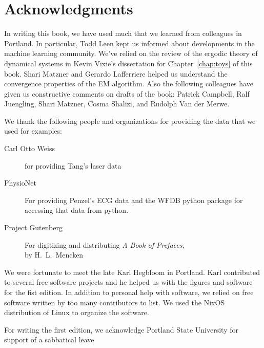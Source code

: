 \documentclass[ltxbook,showlabels, commentsvisible]{hmmdsbook}
\begin{document}
\section*{Acknowledgments}
%
\label{sec:ack}
\longpage%

In writing this book, we have used much that we learned from colleagues
in Portland.  In particular, Todd Leen kept us informed about
developments in the machine learning community.  We've relied on the
review of the ergodic theory of dynamical systems in Kevin Vixie's
dissertation\cite{vixie02} for Chapter~\ref{chap:toys} of this book.
Shari Matzner and Gerardo Lafferriere helped us understand the
convergence properties of the EM algorithm.  Also the following
colleagues have given us constructive comments on drafts of the book:
% 
Patrick Campbell, %
Ralf Juengling, %
Shari Matzner, %
Cosma Shalizi, %
and %
Rudolph Van der Merwe. %

We thank the following people and organizations for providing the data
that we used for examples:
\begin{description}
\item[Carl Otto Weiss] for providing Tang's\cite{Tang92} laser data
\item[PhysioNet\cite{PhysioNet}] For providing Penzel's\cite{Penzel02}
  ECG data and the WFDB python package\cite{WFDB-python} for accessing
  that data from python.
\item[Project Gutenberg] For digitizing and distributing \emph{A
    Book of Prefaces},\\ by H.~L.~Mencken
\end{description}

We were fortunate to meet the late Karl Hegbloom in Portland.  Karl
contributed to several free software projects and he helped us with
the figures and software for the fist edition.  In addition to
personal help with software, we relied on free software written by too
many contributors to list.  We used the NixOS distribution of Linux to
organize the software.

For writing the first edition, we acknowledge Portland State University
for support of a sabbatical leave
%


\tableofcontents
\end{document}
